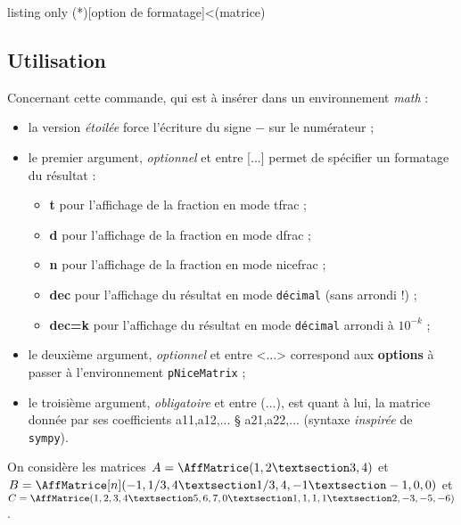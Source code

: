 \documentclass[french,a4paper,11pt]{article}
\newcommand\Cle[1]{{\bfseries\sffamily\textlangle #1\textrangle}}
\newcommand\cmaj[1]{\tcbox[vignetteMaJ]{#1}\xspace}
\begin{document}
\begin{PresentationCode}{listing only}
\AffMatrice(*)[option de formatage]<(matrice)
\end{PresentationCode}

\subsection{Utilisation}

\begin{tipblock}
Concernant cette commande, qui est à insérer dans un environnement \textit{math} :

\begin{itemize}
	\item \cmaj{0.1.3} la version \textit{étoilée} force l'écriture du signe \og $-$ \fg{} sur le numérateur ;
	\item le premier argument, \textit{optionnel} et entre \textsf{[...]} permet de spécifier un formatage du résultat :
	\begin{itemize}
		\item \Cle{t} pour l'affichage de la fraction en mode \textsf{tfrac} ;
		\item \Cle{d} pour l'affichage de la fraction en mode \textsf{dfrac} ;
		\item \Cle{n} pour l'affichage de la fraction en mode \textsf{nicefrac} ;
		\item \Cle{dec} pour l'affichage du résultat en mode \texttt{décimal} (sans arrondi !) ;
		\item \Cle{dec=k} pour l'affichage du résultat en mode \texttt{décimal} arrondi à $10^{-k}$ ;
	\end{itemize}
	\item le deuxième argument, \textit{optionnel} et entre \textsf{<...>} correspond aux \Cle{options} à passer à l'environnement \texttt{pNiceMatrix} ;
	\item le troisième argument, \textit{obligatoire} et entre \textsf{(...)}, est quant à lui, la matrice donnée par ses coefficients \textsf{a11,a12,... § a21,a22,...} (syntaxe \textit{inspirée} de \texttt{sympy}).
\end{itemize}
\vspace*{-\baselineskip}\leavevmode
\end{tipblock}

\begin{PresentationCode}{}
On considère les matrices $A=\AffMatrice(1,2 § 3,4)$
et $B=\AffMatrice[n](-1,1/3,4 § 1/3,4,-1 § -1,0,0)$
et $C=\AffMatrice(1,2,3,4 § 5,6,7,0 § 1,1,1,1 § 2,-3,-5,-6)$.
\end{PresentationCode}
\end{document}
